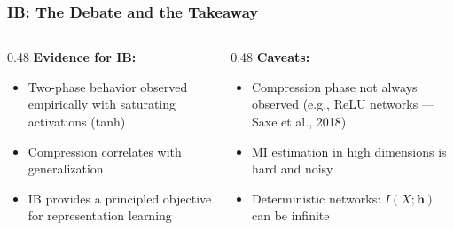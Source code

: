 \documentclass[aspectratio=169]{beamer}
\begin{document}
\begin{frame}
\frametitle{IB: The Debate and the Takeaway}

\small
\begin{columns}[T]
\begin{column}{0.48\textwidth}
\textbf{\textcolor{paramgreen}{Evidence for IB:}}
\begin{itemize}\setlength{\itemsep}{3pt}
  \item Two-phase behavior observed empirically with saturating activations (tanh)
  \item Compression correlates with generalization
  \item IB provides a principled objective for representation learning
\end{itemize}
\end{column}
\begin{column}{0.48\textwidth}
\textbf{\textcolor{sampred}{Caveats:}}
\begin{itemize}\setlength{\itemsep}{3pt}
  \item Compression phase not always observed (e.g., ReLU networks --- Saxe et al., 2018)
  \item MI estimation in high dimensions is hard and noisy
  \item Deterministic networks: $I(X; \mathbf{h})$ can be infinite
\end{itemize}
\end{column}
\end{columns}

\vspace{0.3cm}
\begin{center}
\end{center}
\end{frame}
\end{document}
